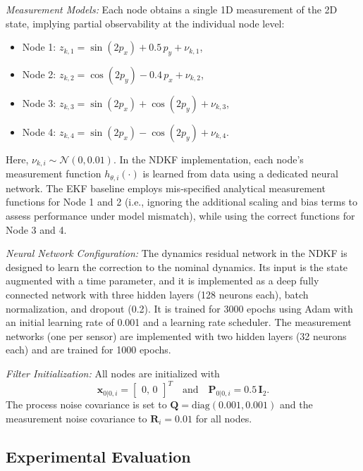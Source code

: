 \documentclass[letterpaper, 10 pt, conference]{ieeeconf}
\begin{document}
\noindent\textit{Measurement Models:}  
Each node obtains a single 1D measurement of the 2D state, implying partial observability at the individual node level:
\begin{itemize}
    \item[] {Node 1:} $z_{k,1} = \sin(2p_x) + 0.5\,p_y + \nu_{k,1}$,
    \item[] {Node 2:} $z_{k,2} = \cos(2p_y) - 0.4\,p_x + \nu_{k,2}$,
    \item[] {Node 3:} $z_{k,3} = \sin(2p_x) + \cos(2p_y) + \nu_{k,3}$,
    \item[] {Node 4:} $z_{k,4} = \sin(2p_x) - \cos(2p_y) + \nu_{k,4}$.
\end{itemize}
Here, $\nu_{k,i} \sim \mathcal{N}(0,0.01)$. In the NDKF implementation, each node’s measurement function $h_{\theta,i}(\cdot)$ is learned from data using a dedicated neural network.
The EKF baseline employs mis‑specified analytical measurement functions for Node 1 and 2 (i.e., ignoring the additional scaling and bias terms to assess performance under model mismatch), while using the correct functions for Node 3 and 4.

\noindent\textit{Neural Network Configuration:}  
The dynamics residual network in the NDKF is designed to learn the correction to the nominal dynamics. Its input is the state augmented with a time parameter, and it is implemented as a deep fully connected network with three hidden layers (128 neurons each), batch normalization, and dropout (0.2). It is trained for 3000 epochs using Adam with an initial learning rate of 0.001 and a learning rate scheduler. The measurement networks (one per sensor) are implemented with two hidden layers (32 neurons each) and are trained for 1000 epochs.

\noindent\textit{Filter Initialization:}  
All nodes are initialized with 
\[
\hat{\mathbf{x}}_{0|0,i} = \begin{bmatrix}0, \, 0\end{bmatrix}^{T} \quad \text{and} \quad \mathbf{P}_{0|0,i} = 0.5\,\mathbf{I}_2.
\]
The process noise covariance is set to $\mathbf{Q}=\mathrm{diag}(0.001,0.001)$ and the measurement noise covariance to $\mathbf{R}_i=0.01$ for all nodes.

\vspace{-5pt}
\subsection{Experimental Evaluation}
\end{document}
